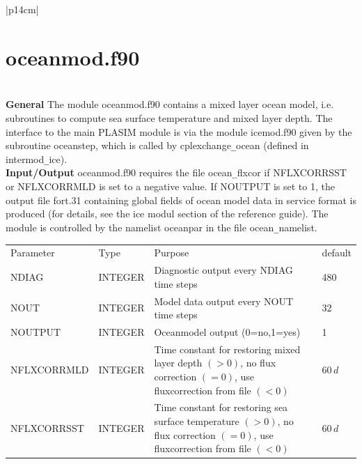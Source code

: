 \clearpage
\begin{center}
\begin{tabular}{|p{14cm}|}
\hline
\vspace{-5mm} \section{oceanmod.f90} \vspace{-5mm} \\
\hline
\vspace{1mm} {\bf General} The module {\module oceanmod.f90} contains
a mixed layer ocean model, i.e. subroutines to compute sea surface
temperature and mixed layer depth. The interface to the main PLASIM
module is via the module {\module icemod.f90} given by the subroutine
{\sub oceanstep}, which is called by {\sub cplexchange\verb#_#ocean}
(defined in {\module intermod\verb#_#ice}).  \vspace{3mm} \\
\hline
\vspace{1mm} {\bf Input/Output} {\module oceanmod.f90} requires the file {\file ocean\verb#_#flxcor} if NFLXCORRSST or NFLXCORRMLD is set to a negative value. If NOUTPUT is set to 1, the output file {\file fort.31} containing global fields of ocean model data in service format is produced (for details, see the ice modul section of the reference guide). The module is controlled by the namelist {\nam oceanpar} in the file {\file ocean\verb#_#namelist}. \vspace{1mm} \\
\begin{tabular}{p{3cm} p{2cm} p{6cm} p{2cm}}
Parameter   & Type    & Purpose 			        & default \\
NDIAG	    & INTEGER & Diagnostic output every NDIAG time steps	& 480	  \\
NOUT	    & INTEGER & Model data output every NOUT time steps	& 32	  \\
NOUTPUT	    & INTEGER & Oceanmodel output (0=no,1=yes)		& 1	  \\
NFLXCORRMLD & INTEGER & Time constant for restoring mixed layer depth $(>0)$, no flux correction $(=0)$, use fluxcorrection from file $(<0)$ & $60\,d$ \\
NFLXCORRSST & INTEGER & Time constant for restoring sea surface temperature $(>0)$, no flux correction $(=0)$, use fluxcorrection from file $(<0)$ & $60\,d$ \\
\end{tabular} \vspace{3mm} \\

\end{tabular}
\end{center}
